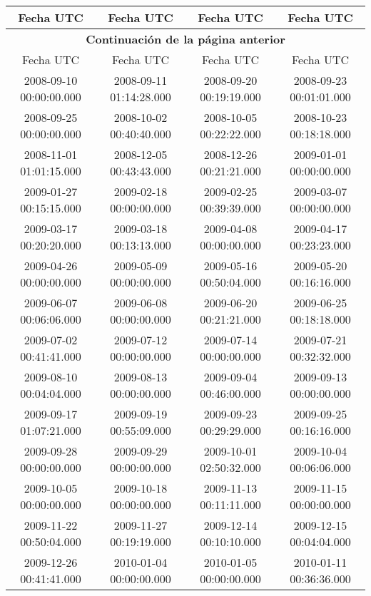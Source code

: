 \begin{longtable}{c c c c}
\toprule
Fecha UTC & Fecha UTC & Fecha UTC & Fecha UTC \\ \midrule
\endfirsthead
\multicolumn{4}{c}{{\bfseries Continuación de la página anterior}} \\ \toprule
Fecha UTC & Fecha UTC & Fecha UTC & Fecha UTC \\ \midrule
\endhead
\bottomrule
2008-09-10 00:00:00.000 & 
2008-09-11 01:14:28.000 & 
2008-09-20 00:19:19.000 & 
2008-09-23 00:01:01.000 \\ \midrule
2008-09-25 00:00:00.000 & 
2008-10-02 00:40:40.000 & 
2008-10-05 00:22:22.000 & 
2008-10-23 00:18:18.000 \\ \midrule
2008-11-01 01:01:15.000 & 
2008-12-05 00:43:43.000 & 
2008-12-26 00:21:21.000 & 
2009-01-01 00:00:00.000 \\ \midrule
2009-01-27 00:15:15.000 & 
2009-02-18 00:00:00.000 & 
2009-02-25 00:39:39.000 & 
2009-03-07 00:00:00.000 \\ \midrule
2009-03-17 00:20:20.000 & 
2009-03-18 00:13:13.000 & 
2009-04-08 00:00:00.000 & 
2009-04-17 00:23:23.000 \\ \midrule
2009-04-26 00:00:00.000 & 
2009-05-09 00:00:00.000 & 
2009-05-16 00:50:04.000 & 
2009-05-20 00:16:16.000 \\ \midrule
2009-06-07 00:06:06.000 & 
2009-06-08 00:00:00.000 & 
2009-06-20 00:21:21.000 & 
2009-06-25 00:18:18.000 \\ \midrule
2009-07-02 00:41:41.000 & 
2009-07-12 00:00:00.000 & 
2009-07-14 00:00:00.000 & 
2009-07-21 00:32:32.000 \\ \midrule
2009-08-10 00:04:04.000 & 
2009-08-13 00:00:00.000 & 
2009-09-04 00:46:00.000 & 
2009-09-13 00:00:00.000 \\ \midrule
2009-09-17 01:07:21.000 & 
2009-09-19 00:55:09.000 & 
2009-09-23 00:29:29.000 & 
2009-09-25 00:16:16.000 \\ \midrule
2009-09-28 00:00:00.000 & 
2009-09-29 00:00:00.000 & 
2009-10-01 02:50:32.000 & 
2009-10-04 00:06:06.000 \\ \midrule
2009-10-05 00:00:00.000 & 
2009-10-18 00:00:00.000 & 
2009-11-13 00:11:11.000 & 
2009-11-15 00:00:00.000 \\ \midrule
2009-11-22 00:50:04.000 & 
2009-11-27 00:19:19.000 & 
2009-12-14 00:10:10.000 & 
2009-12-15 00:04:04.000 \\ \midrule
2009-12-26 00:41:41.000 & 
2010-01-04 00:00:00.000 & 
2010-01-05 00:00:00.000 & 
2010-01-11 00:36:36.000 \\ \midrule

\end{longtable}
